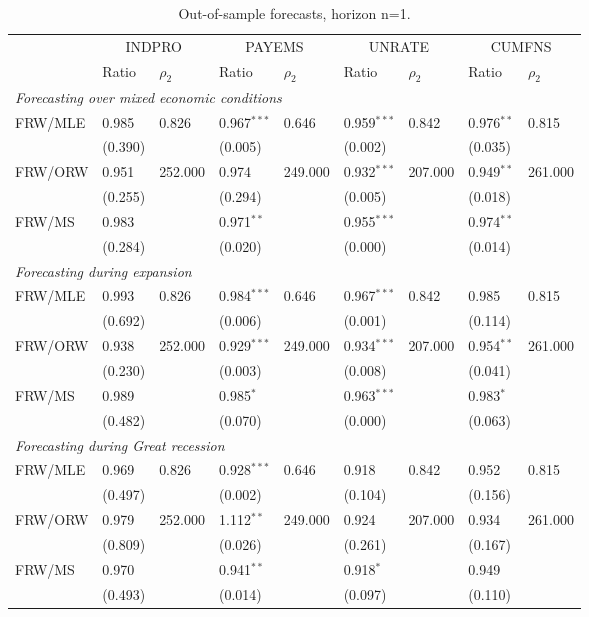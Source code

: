 \begin{table}
\centering
\small
\begin{tabular}{lllllllll}
\toprule
 & \multicolumn{2}{c}{INDPRO} & \multicolumn{2}{c}{PAYEMS} & \multicolumn{2}{c}{UNRATE} & \multicolumn{2}{c}{CUMFNS} \\
 & Ratio & $\rho_2$ & Ratio & $\rho_2$ & Ratio & $\rho_2$ & Ratio & $\rho_2$ \\
\midrule
\multicolumn{9}{l}{\textit{Forecasting over mixed economic conditions}}\\\midrule
FRW/MLE & 0.985 & 0.826 & 0.967$^{***}$ & 0.646 & 0.959$^{***}$ & 0.842 & 0.976$^{**}$ & 0.815 \\
 & (0.390) &  & (0.005) &  & (0.002) &  & (0.035) &  \\[1ex]
FRW/ORW & 0.951 & 252.000 & 0.974 & 249.000 & 0.932$^{***}$ & 207.000 & 0.949$^{**}$ & 261.000 \\
 & (0.255) &  & (0.294) &  & (0.005) &  & (0.018) &  \\[1ex]
FRW/MS & 0.983 &  & 0.971$^{**}$ &  & 0.955$^{***}$ &  & 0.974$^{**}$ &  \\
 & (0.284) &  & (0.020) &  & (0.000) &  & (0.014) &  \\[1ex]
\midrule
\multicolumn{9}{l}{\textit{Forecasting during expansion}}\\\midrule
FRW/MLE & 0.993 & 0.826 & 0.984$^{***}$ & 0.646 & 0.967$^{***}$ & 0.842 & 0.985 & 0.815 \\
 & (0.692) &  & (0.006) &  & (0.001) &  & (0.114) &  \\[1ex]
FRW/ORW & 0.938 & 252.000 & 0.929$^{***}$ & 249.000 & 0.934$^{***}$ & 207.000 & 0.954$^{**}$ & 261.000 \\
 & (0.230) &  & (0.003) &  & (0.008) &  & (0.041) &  \\[1ex]
FRW/MS & 0.989 &  & 0.985$^{*}$ &  & 0.963$^{***}$ &  & 0.983$^{*}$ &  \\
 & (0.482) &  & (0.070) &  & (0.000) &  & (0.063) &  \\[1ex]
\midrule
\multicolumn{9}{l}{\textit{Forecasting during Great recession}}\\\midrule
FRW/MLE & 0.969 & 0.826 & 0.928$^{***}$ & 0.646 & 0.918 & 0.842 & 0.952 & 0.815 \\
 & (0.497) &  & (0.002) &  & (0.104) &  & (0.156) &  \\[1ex]
FRW/ORW & 0.979 & 252.000 & 1.112$^{**}$ & 249.000 & 0.924 & 207.000 & 0.934 & 261.000 \\
 & (0.809) &  & (0.026) &  & (0.261) &  & (0.167) &  \\[1ex]
FRW/MS & 0.970 &  & 0.941$^{**}$ &  & 0.918$^{*}$ &  & 0.949 &  \\
 & (0.493) &  & (0.014) &  & (0.097) &  & (0.110) &  \\[1ex]
\bottomrule
\end{tabular}
\caption{Out-of-sample forecasts, horizon n=1.}
\end{table}